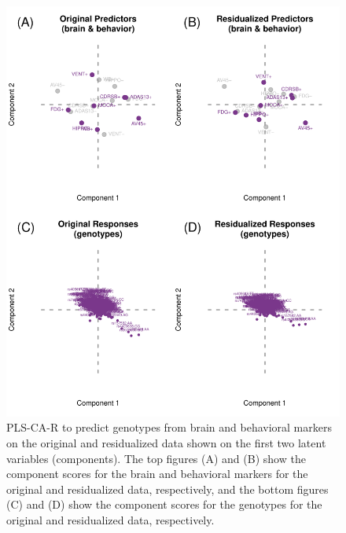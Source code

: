 \documentclass[12pt]{article}
\begin{document}
\begin{figure}[!hbtp]

{\centering \includegraphics[width=.8\textwidth,height=.8\textheight]{PLSCAR_to_a_GPLS_blind_files/figure-latex/unnamed-chunk-9-1} 

}

\caption{\label{fig:original_residualized_ex2} PLS-CA-R to predict genotypes from brain and behavioral markers on the original and residualized data shown on the first two latent variables (components). The top figures (A) and (B) show the component scores for the brain and behavioral markers for the original and residualized data, respectively, and the bottom figures (C) and (D) show the component scores for the genotypes for the original and residualized data, respectively.}\label{fig:unnamed-chunk-9}
\end{figure}
\end{document}

